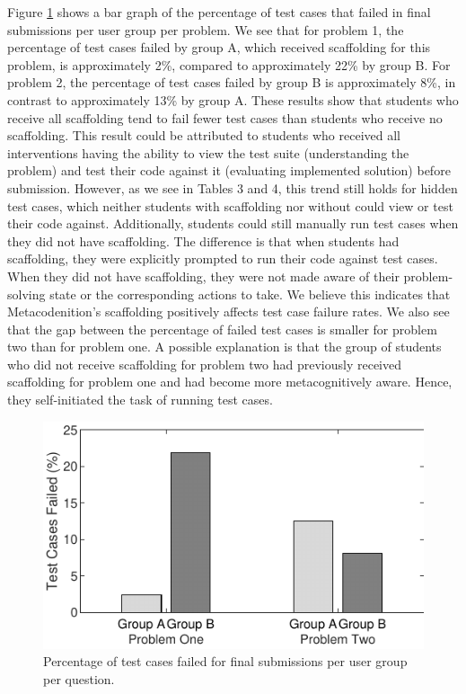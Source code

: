 \documentclass[sigconf,authorversion,nonacm]{acmart}
\begin{document}
Figure \ref{fig:testcases} shows a bar graph of the percentage of test cases that failed in final submissions per user group per problem. We see that for problem 1, the percentage of test cases failed by group A, which received scaffolding for this problem, is approximately 2\%, compared to approximately 22\% by group B. For problem 2, the percentage of test cases failed by group B is approximately 8\%, in contrast to approximately 13\% by group A. These results show that students who receive all scaffolding tend to fail fewer test cases than students who receive no scaffolding. This result could be attributed to students who received all interventions having the ability to view the test suite (understanding the problem) and test their code against it  (evaluating implemented solution) before submission. However, as we see in Tables 3 and 4, this trend still holds for hidden test cases, which neither students with scaffolding nor without could view or test their code against. Additionally, students could still manually run test cases when they did not have scaffolding. The difference is that when students had scaffolding, they were explicitly prompted to run their code against test cases. When they did not have scaffolding, they were not made aware of their problem-solving state or the corresponding actions to take. We believe this indicates that Metacodenition's scaffolding positively affects test case failure rates. We also see that the gap between the percentage of failed test cases is smaller for problem two than for problem one. A possible explanation is that the group of students who did not receive scaffolding for problem two had previously received scaffolding for problem one and had become more metacognitively aware. Hence, they self-initiated the task of running test cases.

\begin{figure}[h!]
  \centering
  \includegraphics[width=\columnwidth]{test_cases}
  \caption{Percentage of test cases failed for final submissions per user group per question.}
  \label{fig:testcases}
\end{figure}
\end{document}

